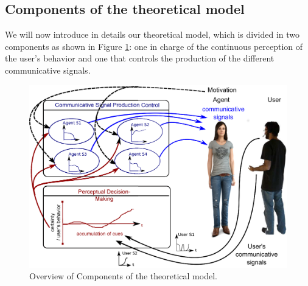 \subsection{Components of the theoretical model}

We will now introduce in details our theoretical model, which is divided in two components as shown in Figure \ref{fig:mod-comp}: one in charge of the continuous perception of the user's behavior and one that controls the production of the different communicative signals. 

\begin{figure}
  \includegraphics[width=\linewidth]{figure/modele_conceptuel_act.eps}
  \caption{Overview of Components of the theoretical model.}
  \label{fig:mod-comp}
\end{figure}


